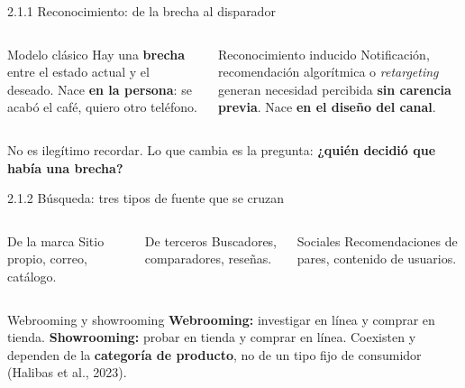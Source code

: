 \documentclass[aspectratio=169,xcolor=dvipsnames]{beamer}
\begin{document}
\begin{frame}{2.1.1 Reconocimiento: de la brecha al disparador}
\begin{columns}[T]
  \begin{block}{Modelo clásico}
    \small Hay una \textbf{brecha} entre el estado actual y el deseado. Nace \textbf{en la persona}: se acabó el café, quiero otro teléfono.
  \end{block}
  \begin{alertblock}{Reconocimiento inducido}
    \small Notificación, recomendación algorítmica o \textit{retargeting} generan necesidad percibida \textbf{sin carencia previa}. Nace \textbf{en el diseño del canal}.
  \end{alertblock}
\end{columns}
\vspace{6pt}
\begin{center}\small No es ilegítimo recordar. Lo que cambia es la pregunta: \textbf{¿quién decidió que había una brecha?}\end{center}
\end{frame}

\begin{frame}{2.1.2 Búsqueda: tres tipos de fuente que se cruzan}
\begin{columns}[T]
  \begin{block}{De la marca}
    \small Sitio propio, correo, catálogo.
  \end{block}
  \begin{exampleblock}{De terceros}
    \small Buscadores, comparadores, reseñas.
  \end{exampleblock}
  \begin{block}{Sociales}
    \small Recomendaciones de pares, contenido de usuarios.
  \end{block}
\end{columns}
\vspace{6pt}
\begin{alertblock}{Webrooming y showrooming}
  \small \textbf{Webrooming:} investigar en línea y comprar en tienda. \textbf{Showrooming:} probar en tienda y comprar en línea. Coexisten y dependen de la \textbf{categoría de producto}, no de un tipo fijo de consumidor (Halibas et al., 2023).
\end{alertblock}
\end{frame}
\end{document}
